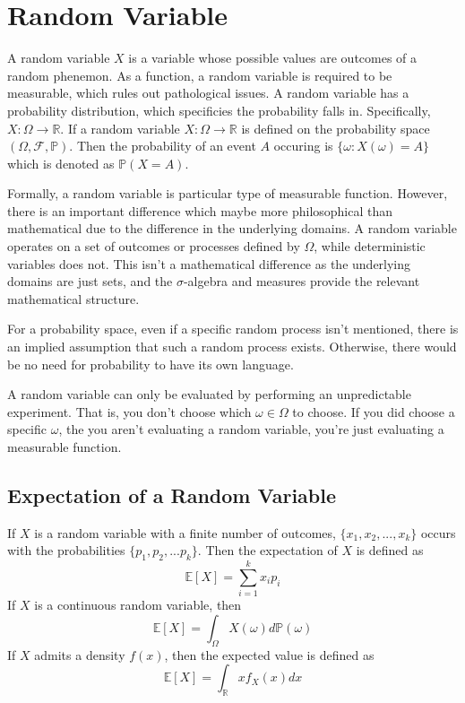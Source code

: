 \section{Random Variable}
A random variable $X$ is a variable whose possible values are outcomes of a random phenemon.  As a function, a random variable is required to be measurable, which rules out pathological issues.  A random variable has a probability distribution, which specificies the probability falls in.  Specifically, $X:\Omega\rightarrow\mathbb{R}$.  If a random variable $X:\Omega \rightarrow \mathbb{R}$ is defined on the probability space $(\Omega,\mathcal{F},\mathbb{P})$.  Then the probability of an event $A$ occuring is $\{\omega:X(\omega)=A\}$ which is denoted as $\mathbb{P}(X=A)$.

Formally, a random variable is particular type of measurable function.  However, there is an important difference which maybe more philosophical than mathematical due to the difference in the underlying domains.  A random variable operates on a set of outcomes or processes defined by $\Omega$, while deterministic variables does not.  This isn't a mathematical difference as the underlying domains are just sets, and the $\sigma$-algebra and measures provide the relevant mathematical structure.

For a probability space, even if a specific random process isn't mentioned, there is an implied assumption that such a random process exists.  Otherwise, there would be no need for probability to have its own language.

A random variable can only be evaluated by performing an unpredictable experiment.  That is, you don't choose which $\omega \in \Omega$ to choose.  If you did choose a specific $\omega$, the you aren't evaluating a random variable, you're just evaluating a measurable function.

\subsection{Expectation of a Random Variable}

If $X$ is a random variable with a finite number of outcomes, $\{x_1,x_2,...,x_k\}$ occurs with the probabilities $\{p_1,p_2,...p_k\}$.  Then the expectation of $X$ is defined as
\begin{equation}
  \mathbb{E}[X]=\sum_{i=1}^{k}x_i p_i
\end{equation}
If $X$ is a continuous random variable, then
\begin{equation}
  \mathbb{E}[X]=\int_{\Omega} X(\omega) d\mathbb{P}(\omega)
\end{equation}
If $X$ admits a density $f(x)$, then the expected value is defined as
\begin{equation}
  \mathbb{E}[X]=\int_{\mathbb{R}}x f_{X}(x) dx
\end{equation}

